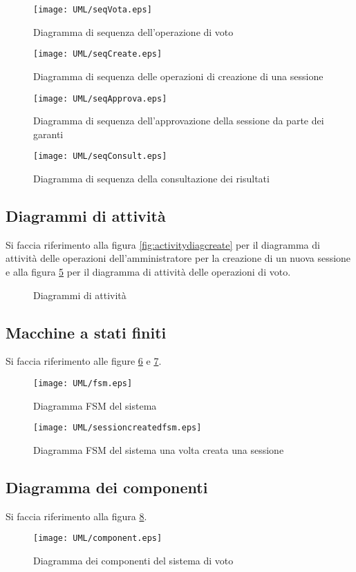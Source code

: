 \begin{figure}[ht]
	\centering
	\texttt{[image: UML/seqVota.eps]}
	\caption{Diagramma di sequenza dell'operazione di voto}
	\label{fig:seqdiagvota}
\end{figure}

\begin{figure}[ht]
	\centering
	\texttt{[image: UML/seqCreate.eps]}
	\caption{Diagramma di sequenza delle operazioni di creazione di una sessione}
	\label{fig:seqdiagcreate}
\end{figure}

\begin{figure}[ht]
	\centering
	\texttt{[image: UML/seqApprova.eps]}
	\caption{Diagramma di sequenza dell'approvazione della sessione da parte dei garanti}
	\label{fig:seqdiagapprova}
\end{figure}

\begin{figure}[ht]
	\centering
	\texttt{[image: UML/seqConsult.eps]}
	\caption{Diagramma di sequenza della consultazione dei risultati}
	\label{fig:seqdiagconsult}
\end{figure}


\subsection{Diagrammi di attività}
Si faccia riferimento alla figura \ref{fig:activitydiagcreate} per il diagramma di attività delle operazioni dell'amministratore per la creazione di un nuova sessione e alla figura \ref{fig:activitydiagvote} per il diagramma di attività delle operazioni di voto.
\begin{figure}[ht]
		\centering
		\caption{Diagrammi di attività}
		\label{fig:activitydiagcreate}
		\label{fig:activitydiagvote}
\end{figure}


\subsection{Macchine a stati finiti}
Si faccia riferimento alle figure \ref{fig:fsm} e \ref{fig:sessionCreatedFsm}.
\begin{figure}[ht]
	\centering
	\texttt{[image: UML/fsm.eps]}
	\caption{Diagramma FSM del sistema}
	\label{fig:fsm}
\end{figure}
\begin{figure}[ht]
	\centering
	\texttt{[image: UML/sessioncreatedfsm.eps]}
	\caption{Diagramma FSM del sistema una volta creata una sessione}
	\label{fig:sessionCreatedFsm}
\end{figure}


\subsection{Diagramma dei componenti}
Si faccia riferimento alla figura \ref{fig:component}.

\begin{figure}[ht]
	\centering
	\texttt{[image: UML/component.eps]}
	\caption{Diagramma dei componenti del sistema di voto}
	\label{fig:component}
\end{figure}
